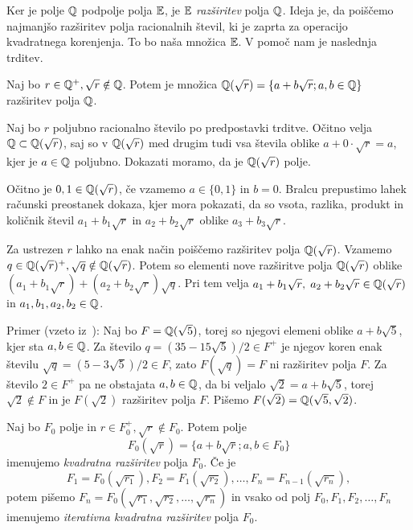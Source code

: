 Ker je polje $\mathbb Q$ podpolje polja $\mathbb E$, je $\mathbb E$ \emph{razširitev} polja $\mathbb Q$. Ideja je, da poiščemo najmanjšo razširitev polja racionalnih števil, ki je zaprta za operacijo kvadratnega korenjenja. To bo naša množica $\mathbb E$. V pomoč nam je naslednja trditev.

\begin{trditev}
    \label{trd:kv_razs_prva}
    Naj bo $r \in \mathbb Q^+, \sqrt{r} \notin \mathbb Q$. Potem je množica $ \mathbb Q(\sqrt{r}) = \{ a + b \sqrt{r}; a, b \in \mathbb Q \}$ razširitev polja $\mathbb Q$.
\end{trditev}
\begin{dokaz}
    Naj bo $r$ poljubno racionalno število po predpostavki trditve. Očitno velja $\mathbb Q \subset \mathbb Q(\sqrt{r})$, saj so v $\mathbb Q(\sqrt{r})$ med drugim tudi vsa števila oblike $a + 0 \cdot \sqrt{r} = a$, kjer je $a \in \mathbb Q$ poljubno. Dokazati moramo, da je $\mathbb Q(\sqrt{r})$ polje.

    Očitno je $0, 1 \in \mathbb Q(\sqrt{r})$, če vzamemo $a \in \{0, 1\}$ in $b = 0$. Bralcu prepustimo lahek računski preostanek dokaza, kjer mora pokazati, da so vsota, razlika, produkt in količnik števil $a_1 + b_1\sqrt{r}$ in $a_2 + b_2\sqrt{r}$ oblike $a_3 + b_3\sqrt{r}$.
\end{dokaz}

Za ustrezen $r$ lahko na enak način poiščemo razširitev polja $\mathbb Q(\sqrt{r})$. Vzamemo $q \in \mathbb Q(\sqrt{r})^+, \sqrt{q} \notin \mathbb Q(\sqrt{r})$. Potem so elementi nove razširitve polja $\mathbb Q(\sqrt{r})$ oblike $(a_1 + b_1\sqrt{r}) + (a_2 + b_2\sqrt{r})\sqrt{q}$. Pri tem velja $a_1 + b_1\sqrt{r}, \; a_2 + b_2\sqrt{r} \in \mathbb Q(\sqrt{r})$ in $a_1, b_1, a_2, b_2 \in \mathbb Q$.

Primer (vzeto iz~\cite[str.\ 36]{geometricconstructions}): Naj bo $F = \mathbb Q(\sqrt{5})$, torej so njegovi elemeni oblike $a + b\sqrt{5}$, kjer sta $a, b \in \mathbb Q$. Za število $q = (35-15\sqrt{5})/2 \in F^+$ je njegov koren enak številu $\sqrt{q} = (5-3\sqrt{5})/2 \in F$, zato $F(\sqrt{q}) = F$ ni razširitev polja $F$. Za število $2 \in F^+$ pa ne obstajata $a, b \in \mathbb Q$, da bi veljalo $\sqrt{2} = a+b\sqrt{5}$, torej $\sqrt{2} \notin F$ in je $F(\sqrt{2})$ razširitev polja $F$. Pišemo $F(\sqrt{2}) = \mathbb Q(\sqrt{5}, \sqrt{2})$. 

\begin{definicija}
    \label{def:kvad_razs}
    Naj bo $F_0$ polje in $r \in F_0^+, \sqrt{r} \notin F_0$. Potem polje
    $$ F_0(\sqrt{r}) = \{a+b\sqrt{r}; a,b \in F_0\} $$
    imenujemo \emph{kvadratna razširitev} polja $F_0$. Če je
    $$ F_1 = F_0(\sqrt{r_1}), F_2 = F_1(\sqrt{r_2}), \ldots, F_n = F_{n-1}(\sqrt{r_n}), $$
    potem pišemo $F_n = F_0(\sqrt{r_1}, \sqrt{r_2}, \ldots, \sqrt{r_n})$ in vsako od polj $F_0, F_1, F_2, \ldots, F_n$ imenujemo \emph{iterativna kvadratna razširitev} polja $F_0$.
\end{definicija}

